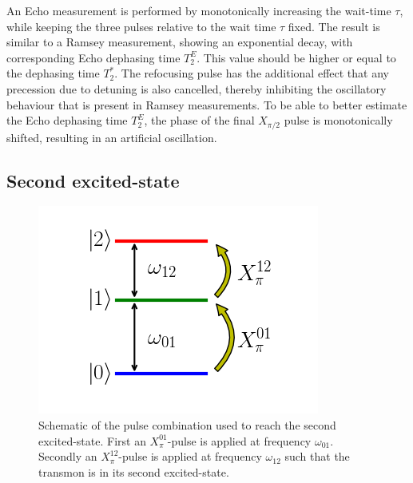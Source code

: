           An Echo measurement is performed by monotonically increasing the wait-time $\tau$, while keeping the three pulses relative to the wait time $\tau$ fixed. The result is similar to a Ramsey measurement, showing an exponential decay, with corresponding Echo dephasing time $T_2^E$. This value should be higher or equal to the dephasing time $T_2^*$. The refocusing pulse has the additional effect that any precession due to detuning is also cancelled, thereby inhibiting the oscillatory behaviour that is present in Ramsey measurements. To be able to better estimate the Echo dephasing time $T_2^E$, the phase of the final $X_{\pi/2}$ pulse is monotonically shifted, resulting in an artificial oscillation.

      \subsection{Second excited-state}
        \label{ssec:Second excited-state}

        \begin{figure}
          \begin{center}
          \vspace{-30pt}
            \includegraphics[width=\textwidth]{../Figures/Exploring frequency re-use/schematic second transition pulsing.png}
          \end{center}
          \vspace{-20 pt}
          \caption{Schematic of the pulse combination used to reach the second excited-state. First an $X_\pi^{01}$-pulse is applied at frequency $\omega_{01}$. Secondly an $X_\pi^{12}$-pulse is applied at frequency $\omega_{12}$ such that the transmon is in its second excited-state.}
          \label{fig:schematic pulsing to second excited-state}
        \end{figure}

